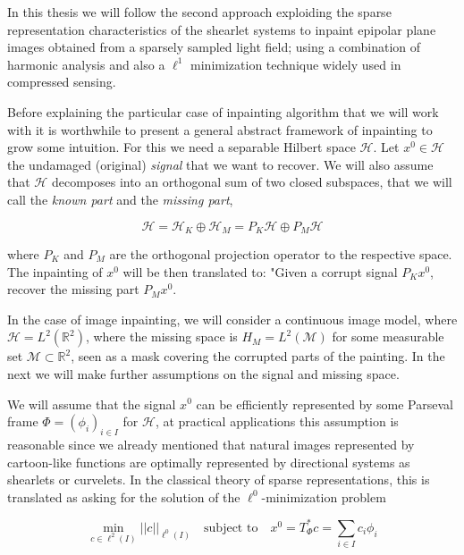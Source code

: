 \bigskip

In this thesis we will follow the second approach exploiding the sparse representation characteristics of the shearlet systems to inpaint epipolar plane images obtained from a sparsely sampled light field; using a combination of harmonic analysis and also a $\ell^1$ minimization technique widely used in compressed sensing. 

\bigskip

Before explaining the particular case of inpainting algorithm that we will work with it is worthwhile to present a general abstract framework of inpainting to grow some intuition. For this we need a separable Hilbert space $\mathcal{H}$. Let $x^0\in\mathcal{H}$ the undamaged (original) \textit{signal} that we want to recover. We will also assume that $\mathcal{H}$ decomposes into an orthogonal sum of two closed subspaces, that we will call the \textit{known part} and the \textit{missing part}, 

$$
\mathcal{H}=\mathcal{H}_K\oplus\mathcal{H}_M=P_K\mathcal{H}\oplus P_M\mathcal{H}
$$

where $P_K$ and $P_M$ are the orthogonal projection operator to the respective space. The inpainting of $x^0$ will be then translated to: "Given a corrupt signal $P_Kx^0$, recover the missing part $P_Mx^0$. 

\bigskip

In the case of image inpainting, we will consider a continuous image model, where $\mathcal{H}=L^2(\mathbb{R}^2)$, where the missing space is $H_M=L^2(\mathcal{M})$ for some measurable set $\mathcal{M}\subset\mathbb{R}^2$, seen as a mask covering the corrupted parts of the painting. In the next we will make further assumptions on the signal and missing space.

\bigskip

We will assume that the signal $x^0$ can be efficiently represented by some Parseval frame $\Phi=(\phi_i)_{i\in I}$ for $\mathcal{H}$, at practical applications this assumption is reasonable since we already mentioned that natural images represented by cartoon-like functions are optimally represented by directional systems as shearlets or curvelets. In the classical theory of sparse representations, this is translated as asking for the solution of the $\ell^0$-minimization problem

\begin{equation}
\label{eq:alpha21}
\underset{c\in\ell^2(I)}{\min}||c||_{\ell^0(I)}\quad\textrm{subject to}\quad x^0=T_{\Phi}^*c=\sum_{i\in I}c_i\phi_i
\end{equation}

